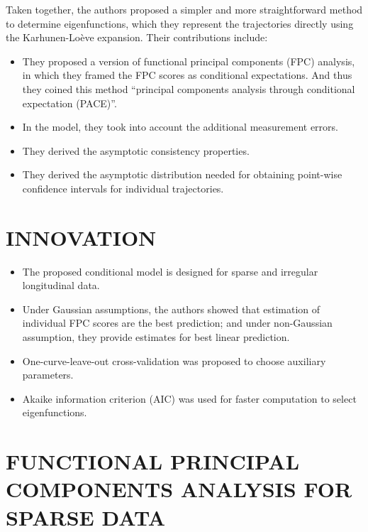 \documentclass[11pt]{report}
\begin{document}
Taken together, the authors proposed a simpler and more straightforward method to determine eigenfunctions, which they represent the trajectories directly using the Karhunen-Lo\`{e}ve expansion.
Their contributions include:
\begin{itemize}
	\item They proposed a version of functional principal components (FPC) analysis, in which they framed the FPC scores as conditional expectations.
	And thus they coined this method ``principal components analysis through conditional expectation (PACE)''.
	\item In the model, they took into account the additional measurement errors. 
	\item They derived the asymptotic consistency properties.
	\item They derived the asymptotic distribution needed for obtaining point-wise confidence intervals for individual trajectories. 
\end{itemize}

\section{INNOVATION} 
\begin{itemize}
	\item The proposed conditional model is designed for sparse and irregular longitudinal data. 
	\item Under Gaussian assumptions, the authors showed that estimation of individual FPC scores are the best prediction; and under non-Gaussian assumption, they provide estimates for best linear prediction. 
	\item One-curve-leave-out cross-validation was proposed to choose auxiliary parameters. 
	\item Akaike information criterion (AIC) was used for faster computation to select eigenfunctions. 
\end{itemize}

\section{FUNCTIONAL PRINCIPAL COMPONENTS ANALYSIS FOR SPARSE DATA}
\end{document}
